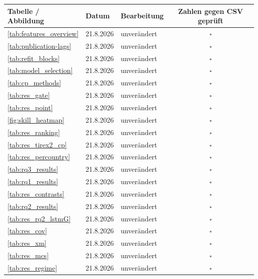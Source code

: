 \begin{tabular}{@{}p{6.2cm}llc@{}}
\toprule
\textbf{Tabelle / Abbildung} & \textbf{Datum} & \textbf{Bearbeitung} & \textbf{Zahlen gegen CSV geprüft} \\
\midrule
\cref{tab:features_overview}          & 21.8.2026 & unver\"andert & $\square$ \\
\cref{tab:publication-lags}           & 21.8.2026 & unver\"andert & $\square$ \\
\cref{tab:refit_blocks}               & 21.8.2026 & unver\"andert & $\square$ \\
\cref{tab:model_selection}            & 21.8.2026 & unver\"andert & $\square$ \\
\cref{tab:cp_methods}                 & 21.8.2026 & unver\"andert & $\square$ \\
\cref{tab:res_gate}                   & 21.8.2026 & unver\"andert & $\square$ \\
\cref{tab:res_point}                  & 21.8.2026 & unver\"andert & $\square$ \\
\cref{fig:skill_heatmap}            & 21.8.2026 & unver\"andert & $\square$ \\
\cref{tab:res_ranking}                & 21.8.2026 & unver\"andert & $\square$ \\
\cref{tab:res_tirex2_cp}              & 21.8.2026 & unver\"andert & $\square$ \\
\cref{tab:res_percountry}             & 21.8.2026 & unver\"andert & $\square$ \\
\cref{tab:rq3_results}                & 21.8.2026 & unver\"andert & $\square$ \\
\cref{tab:rq1_results}                & 21.8.2026 & unver\"andert & $\square$ \\
\cref{tab:res_contrasts}              & 21.8.2026 & unver\"andert & $\square$ \\
\cref{tab:rq2_results}                & 21.8.2026 & unver\"andert & $\square$ \\
\cref{tab:res_rq2_lstmG}              & 21.8.2026 & unver\"andert & $\square$ \\
\cref{tab:res_cov}                    & 21.8.2026 & unver\"andert & $\square$ \\
\cref{tab:res_xm}                     & 21.8.2026 & unver\"andert & $\square$ \\
\cref{tab:res_mcs}                    & 21.8.2026 & unver\"andert & $\square$ \\
\cref{tab:res_regime}                 & 21.8.2026 & unver\"andert & $\square$ \\

\end{tabular}
